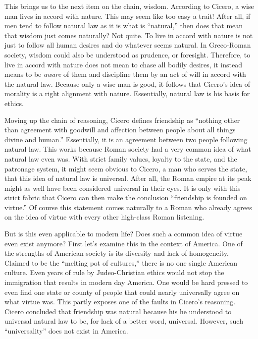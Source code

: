 \documentclass[12pt, letterpaper]{article}
\begin{document}
This brings us to the next item on the chain, wisdom. According to Cicero, a wise man lives in accord with 
nature.\autocite[sec. 32]{cicero} This may seem like too easy a trait! After all, if men tend to follow natural law as it is what is 
``natural,'' then does that mean that wisdom just comes naturally? Not quite. To live in accord with nature 
is not just to follow all human desires and do whatever seems natural. In Greco-Roman society, wisdom 
could also be understood as prudence, or foresight. Therefore, to live in accord with nature does not mean 
to chase all bodily desires, it instead means to be \emph{aware} of them and discipline them by an act of will in accord with the natural law.
Because only a wise man is good, it follows that Cicero’s idea of morality is a right alignment with 
nature. Essentially, natural law is his basis for ethics.

Moving up the chain of reasoning, Cicero defines friendship as ``nothing other than agreement with goodwill 
and affection between people about all things divine and human.''\autocite[sec. 20]{cicero} Essentially, it is an agreement between two 
people following natural law. This works because Roman society had a very common idea of what natural law even 
was. With strict family values, loyalty to the state, and the patronage system, 
it might seem obvious to Cicero, a man who serves the state, that this idea of natural law is universal. 
After all, the Roman empire at its peak might as well have been considered universal in their eyes. It is 
only with this strict fabric that Cicero can then make the conclusion ``friendship is founded on virtue.''\autocite[sec. 37]{cicero} 
Of course this statement comes naturally to a Roman who already agrees on the idea of virtue with every other 
high-class Roman listening.

But is this even applicable to modern life? Does such a common idea of virtue even exist anymore? First let’s 
examine this in the context of America. One of the strengths of American society is its diversity and lack of 
homogeneity. Claimed to be the “melting pot of cultures,” there is no one single American culture. Even years
of rule by Judeo-Christian ethics would not stop the immigration that results in modern day America. One would be hard 
pressed to even find one state or county of people that could nearly universally agree on what virtue was. This 
partly exposes one of the faults in Cicero’s reasoning. 
Cicero concluded that friendship was natural because his he understood to universal natural law to be, for lack of a better word, universal.
However, such “universality” does not exist in America. 
\end{document}
